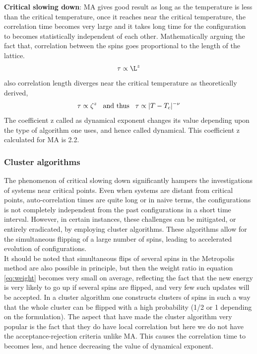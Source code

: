 \documentclass[a4paper,8pt]{article}
\begin{document}
\noindent \textbf{Critical slowing down}: MA gives good result as long as the temperature is less than the critical temperature, once it reaches near the critical temperature, the correlation time becomes very large and it takes long time for the configuration to becomes statistically independent of each other. Mathematically arguing the fact that, correlation between the spins goes proportional to the length of the lattice. 
\begin{equation}
    \tau \propto \L^z
\end{equation}
also correlation length diverges near the critical temperature as theoretically derived\supercite{baxter1982exactly},
\begin{equation}
    \tau \propto \zeta^{z}  \hspace{0.3cm} \text{and thus} \hspace{0.3cm} \tau \propto |T - T_c|^{-\nu}  \label{eq:correlation_time}
\end{equation} 
The coefficient z called as dynamical exponent changes its value depending upon the type of algorithm one uses, and hence called dynamical. This coefficient z calculated for MA is 2.2. 


\subsubsection{Cluster algorithms}
The phenomenon of critical slowing down significantly hampers the investigations of systems near critical points. Even when systems are distant from critical points, auto-correlation times are quite long or in naive terms, the configurations is not completely independent from the past configurations in a short time interval. However, in certain instances, these challenges can be mitigated, or entirely eradicated, by employing cluster algorithms. These algorithms allow for the simultaneous flipping of a large number of spins, leading to accelerated evolution of configurations. \\

It should be noted that simultaneous flips of several spins in the Metropolis method are also possible
in principle, but then the weight ratio in equation \ref{eq:weight} becomes very small on average, reflecting the fact that the new energy is very likely to go up if several spins are flipped, and very few such updates will be accepted. In a cluster algorithm one constructs clusters of spins in such a way that the whole cluster can be flipped with a high probability (1/2 or 1 depending on the formulation). The aspect that have made the cluster algorithm very popular is the fact that they do have local correlation but here we do not have the acceptance-rejection criteria unlike MA. This causes the correlation time to becomes less, and hence decreasing the value of dynamical exponent. \\
\end{document}
